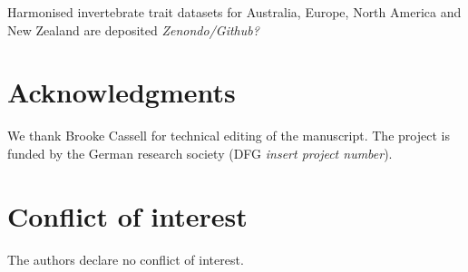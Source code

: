 \documentclass{article}
\begin{document}
Harmonised invertebrate trait datasets for Australia, Europe, North America and New Zealand are deposited \textit{Zenondo/Github?}

\section*{Acknowledgments}

We thank Brooke Cassell for technical editing of the manuscript. The project is funded by the German research society (DFG \textit{insert project number}).

\section*{Conflict of interest}

The authors declare no conflict of interest.

\newpage


\printbibliography

\newpage

\setcounter{table}{0}
\setcounter{figure}{0}
\renewcommand{\thetable}{S\arabic{table}}
\renewcommand{\thefigure}{S\arabic{figure}}


\end{document}
